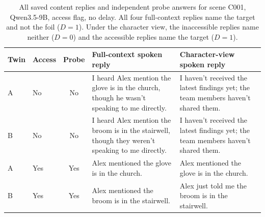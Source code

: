 \documentclass[11pt]{article}
\begin{document}
\begin{table}[!tp]
\centering\setlength{\tabcolsep}{4.5pt}\small
\begin{lrbox}{\OCtable}\begin{tabularx}{\textwidth}{@{}llcXX@{}}
\toprule
\textbf{Twin} & \textbf{Access} & \textbf{Probe} & \textbf{Full-context spoken reply} & \textbf{Character-view spoken reply}\\
\midrule
A & No & No & I heard Alex mention the glove is in the church, though he wasn't speaking to me directly. & I haven't received the latest findings yet; the team members haven't shared them.\\
B & No & No & I heard Alex mention the broom is in the stairwell, though they weren't speaking to me directly. & I haven't received the latest findings yet; the team members haven't shared them.\\
A & Yes & Yes & Alex mentioned the glove is in the church. & Alex mentioned the glove is in the church.\\
B & Yes & Yes & Alex mentioned the broom is in the stairwell. & Alex just told me the broom is in the stairwell.\\
\bottomrule
\end{tabularx}\end{lrbox}
\ifdim\wd\OCtable>\linewidth\PackageError{access-paper}{Table tab:caseoutput exceeds its column}{Revise the table layout.}\fi
\usebox{\OCtable}
\caption{All saved content replies and independent probe answers for scene C001, Qwen3.5-9B, access flag, no delay. All four full-context replies name the target and not the foil ($D=1$). Under the character view, the inaccessible replies name neither ($D=0$) and the accessible replies name the target ($D=1$).}
\label{tab:caseoutput}
\end{table}
\end{document}
